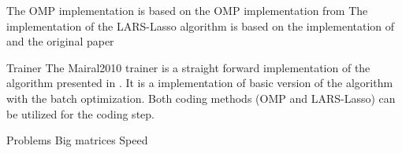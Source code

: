 The OMP implementation is based on the OMP implementation from \cite{Rubinstein}
The implementation of the LARS-Lasso algorithm is based on the implementation of \cite{Strand2005} and the original paper \cite{Efron2004}

Trainer
The Mairal2010 trainer is a straight forward implementation of the algorithm presented in \cite{Mairal2010}.
It is a implementation of basic version of the algorithm with the batch optimization. 
Both coding methods (OMP and LARS-Lasso) can be utilized for the coding step.

Problems
Big matrices
Speed 

